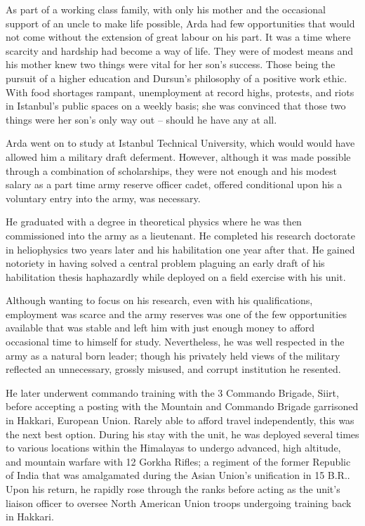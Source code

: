 As part of a working class family, with only his mother and the occasional support of an uncle to make life possible, Arda had few opportunities that would not come without the extension of great labour on his part. It was a time where scarcity and hardship had become a way of life. They were of modest means and his mother knew two things were vital for her son's success. Those being the pursuit of a higher education and Dursun's philosophy of a positive work ethic. With food shortages rampant, unemployment at record highs, protests, and riots in Istanbul's public spaces on a weekly basis; she was convinced that those two things were her son's only way out -- should he have any at all.

Arda went on to study at Istanbul Technical University, which would would have allowed him a military draft deferment. However, although it was made possible through a combination of scholarships, they were not enough and his modest salary as a part time army reserve officer cadet, offered conditional upon his a voluntary entry into the army, was necessary. 

He graduated with a degree in theoretical physics where he was then commissioned into the army as a lieutenant. He completed his research doctorate in heliophysics two years later and his habilitation one year after that. He gained notoriety in having solved a central problem plaguing an early draft of his habilitation thesis haphazardly while deployed on a field exercise with his unit.

Although wanting to focus on his research, even with his qualifications, employment was scarce and the army reserves was one of the few opportunities available that was stable and left him with just enough money to afford occasional time to himself for study. Nevertheless, he was well respected in the army as a natural born leader; though his privately held views of the military reflected an unnecessary, grossly misused, and corrupt institution he resented.

He later underwent commando training with the 3 Commando Brigade, Siirt, before accepting a posting with the Mountain and Commando Brigade garrisoned in Hakkari, European Union. Rarely able to afford travel independently, this was the next best option. During his stay with the unit, he was deployed several times to various locations within the Himalayas to undergo advanced, high altitude, and mountain warfare with 12 Gorkha Rifles; a regiment of the former Republic of India that was amalgamated during the Asian Union's unification in 15 B.R.. Upon his return, he rapidly rose through the ranks before acting as the unit's liaison officer to oversee North American Union troops undergoing training back in Hakkari.

